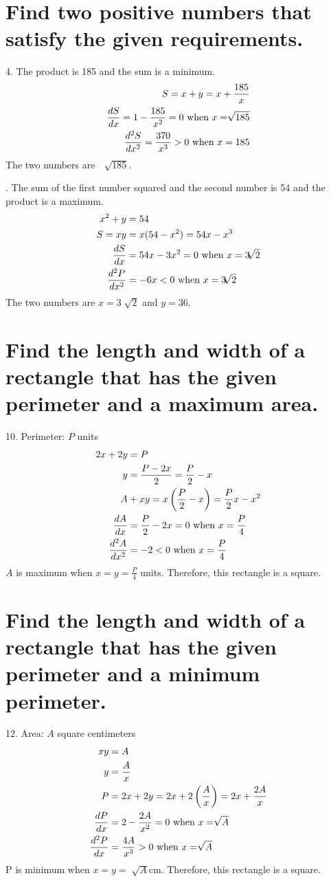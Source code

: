 \documentclass[11pt]{article}
\newcommand*{\vs}{\vspace{1cm}}
\newcommand*{\next}{\noindent}
\newcommand*{\set}{\setcounter{equation}{0}}
\begin{document}
\section{Find two positive numbers that satisfy the given requirements.}
4. The product is 185 and the sum is a minimum.
\begin{align}
    \set
    S=x+y=x+\frac{185}{x}\\
    \frac{dS}{dx}=1-\frac{185}{x^2}=0\,\,\text{when}\,\, x=\sqrt[]{185}\\
    \frac{d^2S}{dx^2}=\frac{370}{x^3}>0\,\,\text{when}\,\, x=185
\end{align}
The two numbers are $\,\,\sqrt[]{185}$.

\vs\next
8. The sum of the first number squared and the second number is 54 and the product is a maximum.
\begin{align}
    \set
    x^2+y&=54\\
    S=xy&=x(54-x^2)=54x-x^3\\
    \frac{dS}{dx}&=54x-3x^2=0\,\,\text{when}\,\, x=3\sqrt[]{2}\\
    \frac{d^2P}{dx^2}&=-6x<0\,\,\text{when}\,\, x=3\sqrt[]{2}
\end{align}
The two numbers are $x=3\sqrt[]{2}$ and $y=36$.

\section{Find the length and width of a rectangle that has the given perimeter and a maximum area.}
10. Perimeter: $P$ units
\begin{align}
    \set
    2x+2y&=P\\
    y&=\frac{P-2x}{2}=\frac{P}{2}-x\\
    A&+xy=x\left(\frac{P}{2}-x\right)=\frac{P}{2}x-x^2\\
    \frac{dA}{dx}&=\frac{P}{2}-2x=0\,\,\text{when}\,\,x=\frac{P}{4}\\
    \frac{d^2A}{dx^2}&=-2<0\,\,\text{when}\,\, x=\frac{P}{4}
\end{align}
$A$ is maximum when $x=y=\frac{P}{4}$ units. Therefore, this rectangle is a square.

\section{Find the length and width of a rectangle that has the given perimeter and a minimum perimeter.}
12. Area: $A$ square centimeters
\begin{align}
    \set
    xy&=A\\
    y&=\frac{A}{x}\\
    P&=2x+2y=2x+2\left(\frac{A}{x}\right)=2x+\frac{2A}{x}\\
    \frac{dP}{dx}&=2-\frac{2A}{x^2}=0\,\,\text{when}\,\, x=\sqrt[]{A}\\
    \frac{d^2P}{dx}&=\frac{4A}{x^3}>0\,\,\text{when}\,\, x=\sqrt[]{A}
\end{align}
P is minimum when $x=y=\sqrt[]{A}$cm. Therefore, this rectangle is a square.
\end{document}
